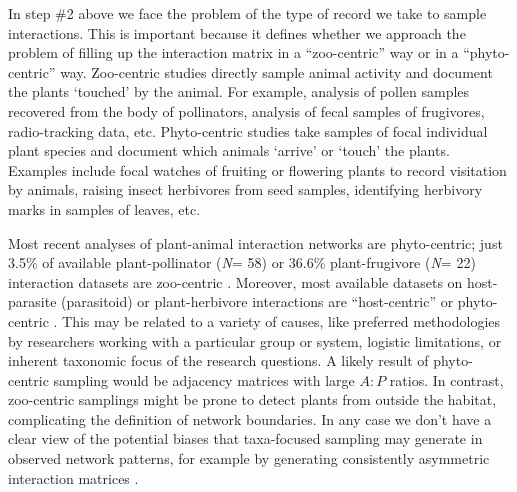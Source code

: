 \documentclass[12pt]{article}
\begin{document}

In step \#2 above we face the problem of the type of record we take to sample interactions. This is important because it defines whether we approach the problem of filling up the interaction matrix in a ``zoo-centric'' way or in a ``phyto-centric'' way. Zoo-centric studies directly sample animal activity and document the plants `touched' by the animal. For example, analysis of pollen samples recovered from the body of pollinators, analysis of fecal samples of frugivores, radio-tracking data, etc. Phyto-centric studies take samples of focal individual plant species and document which animals `arrive' or `touch' the plants. Examples include focal watches of fruiting or flowering plants to record visitation by animals, raising insect herbivores from seed samples, identifying herbivory marks in samples of leaves, etc. 

Most recent analyses of plant-animal interaction networks are phyto-centric; just 3.5\% of available plant-pollinator (\emph{N}= 58) or 36.6\% plant-frugivore (\emph{N}= 22) interaction datasets are zoo-centric \citep[see][]{Schleuning:2012eg}. Moreover, most available datasets on host-parasite (parasitoid) or plant-herbivore interactions are ``host-centric'' or phyto-centric \citep[e.g.,][]{Thebault:2010jv,Morris:2013eh,Eklof:2013ed}. This may be related to a variety of causes, like preferred methodologies by researchers working with a particular group or system, logistic limitations, or inherent taxonomic focus of the research questions. A likely result of phyto-centric sampling would be adjacency matrices with large $A:P$ ratios. In contrast, zoo-centric samplings might be prone to detect plants from outside the habitat, complicating the definition of network boundaries. In any case we don't have a clear view of the potential biases that taxa-focused sampling may generate in observed network patterns, for example by generating consistently asymmetric interaction matrices \citep{Dormann:2009aa}.  
\end{document}
